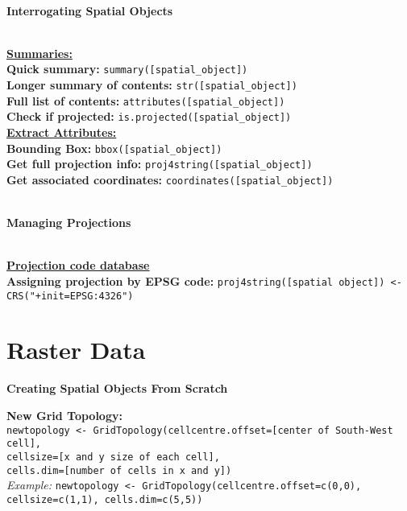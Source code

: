 \documentclass[10pt]{article}
\begin{document}

\hrulefill \\ 
\centerline{\textbf{Interrogating Spatial Objects}} \\
\underline{\textbf{Summaries:} }\\
\textbf{Quick summary:} \texttt{summary([spatial\_object])}\\
\textbf{Longer summary of contents:} \texttt{str([spatial\_object])}\\
\textbf{Full list of contents:} \texttt{attributes([spatial\_object])}\\
\textbf{Check if projected:} \texttt{is.projected([spatial\_object])}\\

\underline{\textbf{Extract Attributes:} }\\
\textbf{Bounding Box:} \texttt{bbox([spatial\_object])}\\
\textbf{Get full projection info:} \texttt{proj4string([spatial\_object])}\\
\textbf{Get associated coordinates:} \texttt{coordinates([spatial\_object])}\\


\hrulefill \\ 
\centerline{\textbf{Managing Projections}} \\
\href{http://www.spatialreference.org/}{\underline{\textbf{Projection code database}}} \\
\hspace{0.3cm}
\textbf{Assigning projection by EPSG code:} \texttt{proj4string([spatial object]) <-CRS("+init=EPSG:4326")}

\section*{Raster Data}



\centerline{\textbf{Creating Spatial Objects From Scratch}} 

\textbf{New Grid Topology:} \\
\texttt{newtopology <- GridTopology(cellcentre.offset=[center of South-West cell], \\
\hspace*{4cm} cellsize=[x and y size of each cell], \\
\hspace*{4cm} cells.dim=[number of cells in x and y])} \\
\emph{Example:} \texttt{newtopology <- GridTopology(cellcentre.offset=c(0,0), cellsize=c(1,1), cells.dim=c(5,5))} 
\end{document}
